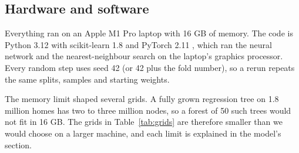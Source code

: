 \documentclass[sigconf,nonacm,10pt]{acmart}
\begin{document}
\subsection{Hardware and software}
Everything ran on an Apple M1 Pro laptop with 16 GB of memory. The code is Python 3.12 with scikit-learn 1.8 \cite{pedregosa2011} and PyTorch 2.11 \cite{paszke2019}, which ran the neural network and the nearest-neighbour search on the laptop's graphics processor. Every random step uses seed 42 (or 42 plus the fold number), so a rerun repeats the same splits, samples and starting weights.

The memory limit shaped several grids. A fully grown regression tree on 1.8 million homes has two to three million nodes, so a forest of 50 such trees would not fit in 16 GB. The grids in Table~\ref{tab:grids} are therefore smaller than we would choose on a larger machine, and each limit is explained in the model's section.
\end{document}
